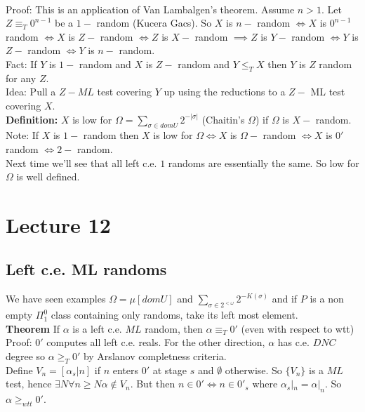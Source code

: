 \documentclass{article}
\begin{document}
      \\ Proof: This is an application of Van Lambalgen's theorem. Assume $n>1$. Let $Z \equiv_T 0^{n-1}$ be a $1-$ random (Kucera Gacs). So $X$ is $n-$ random $\iff X$ is $0^{n-1}$ random $\iff X$ is $Z-$ random $\iff Z$ is $X-$ random $\implies Z$ is $Y-$ random $\iff Y$ is $Z - $ random $\iff Y $ is $n-$ random.
      \\
      Fact: If $Y$ is $1-$ random and $X$ is $Z-$ random and $Y \leq_TX$ then $Y $ is $Z$ random for any $Z$.\\
      Idea: Pull a $Z-ML$ test covering $Y$ up using the reductions to a $Z-$ ML test covering $X$.\\
      \textbf{Definition:} $X$ is low for $\Omega = \sum_{\sigma \in dom U} 2^{-|\sigma|}$ (Chaitin's $\Omega$)  if $\Omega$ is $X-$ random. 
      \\
      Note: If $X$ is $1-$ random then $X$ is low for $\Omega \iff X $ is $\Omega-$ random $\iff X$ is $0'$ random $ \iff 2-$ random.\\
      Next time we'll see that all left c.e. $1$ randoms are essentially the same. So low for $\Omega$ is well defined.
      \newpage
      \section{Lecture 12}
      \subsection{Left c.e. ML randoms}
      We have seen examples $\Omega = \mu[dom U]$ and $\sum_{\sigma \in 2^{<\omega}} 2^{-K(\sigma)}$ and if $P$ is a non empty $\Pi^0_1$ class containing only randoms, take its left most element.\\
      \textbf{Theorem} If $\alpha$ is a left c.e. $ML$ random, then $\alpha \equiv_T 0'$ (even with respect to wtt)\\
      Proof: $0'$ computes all left c.e. reals. For the other direction, $\alpha$ has c.e. $DNC$ degree so $\alpha \geq_T 0'$ by Arslanov completness criteria.\\
      Define $V_n = [\alpha_s|n]$ if $n$ enters $0'$ at stage $s$ and $\emptyset $ otherwise. So $\{V_n\}$ is a $ML$ test, hence $\exists N \forall n\geq N \alpha \not \in V_n$. But then $n \in 0' \iff n \in 0'_s$ where $\alpha_s|_n = \alpha|_n$. So $\alpha \geq_{wtt} 0'$.
\end{document}
